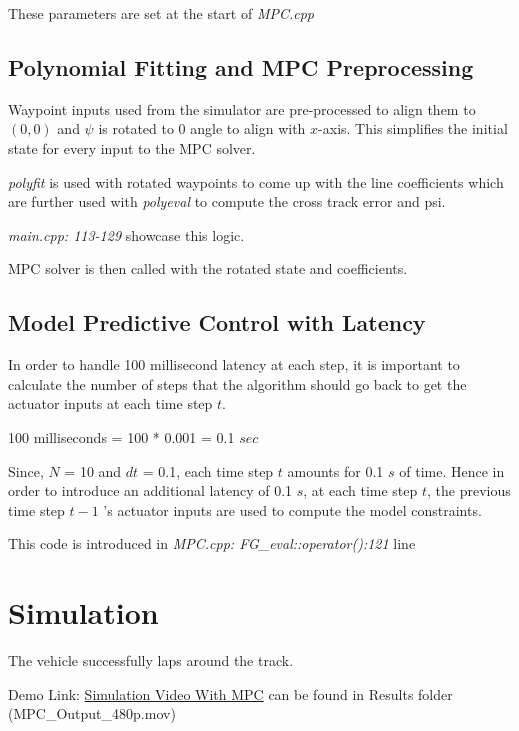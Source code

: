 \documentclass[12pt]{article}
\begin{document}
These parameters are set at the start of \textit{MPC.cpp}

\subsection{Polynomial Fitting and MPC Preprocessing}
Waypoint inputs used from the simulator are pre-processed to align them to $(0,0)$ and $\psi$ is rotated to 0 angle to align with $x$-axis. This simplifies the initial state for every input to the MPC solver. 

\textit{polyfit} is used with rotated waypoints to come up with the line coefficients which are further used with \textit{polyeval} to compute the cross track error and psi. 

\textit{main.cpp: 113-129} showcase this logic. 

MPC solver is then called with the rotated state and coefficients. 

\subsection{Model Predictive Control with Latency}
In order to handle 100 millisecond latency at each step, it is important to calculate the number of steps that the algorithm should go back to get the actuator inputs at each time step $t$.

100 milliseconds = 100 * 0.001 = 0.1 $sec$

Since, $N$ = 10 and $dt$ = 0.1, each time step $t$ amounts for 0.1 $s$ of time. Hence in order to introduce an additional latency of 0.1 $s$, at each time step $t$, the previous time step $t-1$ 's actuator inputs are used to compute the model constraints. 

This code is introduced in \textit{MPC.cpp: FG\_eval::operator():121} line

\section{Simulation}
The vehicle successfully laps around the track.

Demo Link: \href{./Results/MPC_Output_480p.mov}{Simulation Video With MPC} can be found in Results folder (MPC\_Output\_480p.mov)
\end{document}
